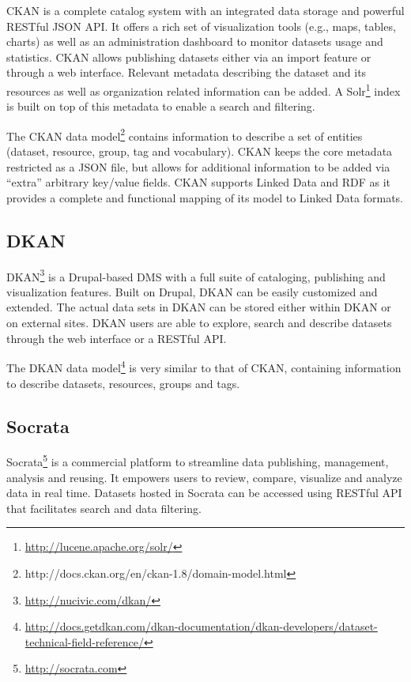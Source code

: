 \documentclass[runningheads,a4paper]{llncs}
\begin{document}
CKAN is a complete catalog system with an integrated data storage and powerful RESTful JSON API. It offers a rich set of visualization tools (e.g., maps, tables, charts) as well as an administration dashboard to monitor datasets usage and statistics. CKAN allows publishing datasets either via an import feature or through a web interface. Relevant metadata describing the dataset and its resources as well as organization related information can be added. A Solr\footnote{\url{http://lucene.apache.org/solr/}} index is built on top of this metadata to enable a search and filtering.

The CKAN data model\footnote{http://docs.ckan.org/en/ckan-1.8/domain-model.html} contains information to describe a set of entities (dataset, resource, group, tag and vocabulary). CKAN keeps the core metadata restricted as a JSON file, but allows for additional information to be added via ``extra'' arbitrary key/value fields. CKAN supports Linked Data and RDF as it provides a complete and functional mapping of its model to Linked Data formats.

\subsection{DKAN}

DKAN\footnote{\url{http://nucivic.com/dkan/}} is a Drupal-based DMS with a full suite of cataloging, publishing and visualization features. Built on Drupal, DKAN can be easily customized and extended. The actual data sets in DKAN can be stored either within DKAN or on external sites. DKAN users are able to explore, search and describe datasets through the web interface or a RESTful API.

The DKAN data model\footnote{\url{http://docs.getdkan.com/dkan-documentation/dkan-developers/dataset-technical-field-reference/}} is very similar to that of CKAN, containing information to describe datasets, resources, groups and tags.

\subsection{Socrata}

Socrata\footnote{\url{http://socrata.com}} is a commercial platform to streamline data publishing, management, analysis and reusing. It empowers users to review, compare, visualize and analyze data in real time. Datasets hosted in Socrata can be accessed using RESTful API that facilitates search and data filtering.
\end{document}
